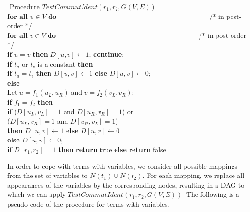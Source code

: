 \documentclass[a4paper]{llncs}
\begin{document}
\begin{rm}
\begin{tabbing}
\quad \= \quad \= \quad \= \quad \= \quad \= \quad \= \quad \= \quad \= \quad \= \kill
\> Procedure $TestCommutIdent(r_1,r_2,G(V,E))$\\
\> \> {\bf for all} $u \in V$ {\bf do}~~~~~~~~~~~~~~~~~~~~~~~~~~~~~~~~~~~~~~~~~~~~~/* in post-order */\\
\> \> \> {\bf for all} $v \in V$ {\bf do}~~~~~~~~~~~~~~~~~~~~~~~~~~~~~~~~~~~~~~~~~~/* in post-order */\\
\> \> \> \> {\bf if} $u=v$ {\bf then} $D[u,v] \leftarrow 1$; {\bf continue};\\
\> \> \> \> {\bf if} $t_u$ or $t_v$ is a constant {\bf then} \\
\> \> \> \> \> {\bf if} $t_u = t_v$ {\bf then} $D[u,v] \leftarrow 1$ {\bf else} $D[u,v] \leftarrow 0$;\\
\> \> \> \> {\bf else}\\
\> \> \> \> \> Let $u = f_1(u_L,u_R)$ and $v=f_2(v_L,v_R)$; \\
\> \> \> \> \> {\bf if} $f_1 = f_2$ {\bf then}\\
\> \> \> \> \> \> {\bf if} ($D[u_L,v_L]=1$ and $D[u_R,v_R]=1$) or \\
\> \> \> \> \> \> \> \> \> ($D[u_L,v_R]=1$ and $D[u_R,v_L]=1$) \\
\> \> \> \> \> \> {\bf then} $D[u,v] \leftarrow 1$ {\bf else} $D[u,v] \leftarrow 0$\\
\> \> \> \> \> {\bf else} $D[u,v] \leftarrow 0$;\\
\> \> {\bf if} $D[r_1,r_2]=1$ {\bf then} {\bf return} true {\bf else} {\bf return} false.
\end{tabbing}
\end{rm}

In order to cope with terms with variables,
we consider all possible mappings from the set of variables to
$N(t_1) \cup N(t_2)$.
For each mapping,
we replace all appearances of the variables by the corresponding nodes,
resulting in a DAG to which we can apply $TestCommutIdent(r_1,r_2,G(V,E))$.
The following is a pseudo-code of the procedure for terms with variables.
\end{document}
